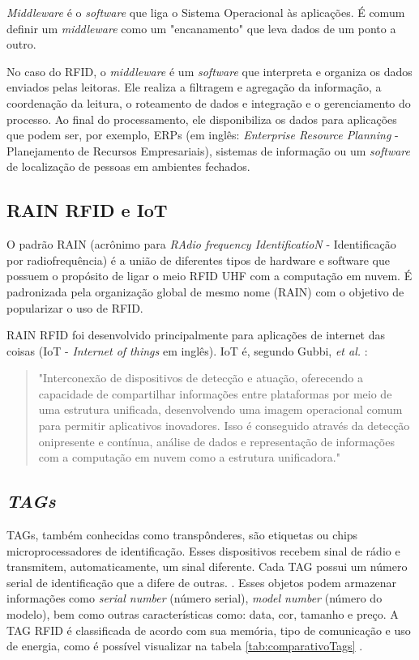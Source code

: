 \textit{Middleware} é o \textit{software} que liga o Sistema Operacional às aplicações. É comum definir um \textit{middleware} como um "encanamento" que leva dados de um ponto a outro. \cite{Middleware}

No caso do RFID, o \textit{middleware} é um \textit{software} que interpreta e organiza os dados enviados pelas leitoras. Ele realiza a filtragem e agregação da informação, a coordenação da leitura, o roteamento de dados e integração e o gerenciamento do processo. Ao final do processamento, ele disponibiliza os dados para aplicações que podem ser, por exemplo, ERPs (em inglês: \textit{Enterprise Resource Planning} - Planejamento de Recursos Empresariais), sistemas de informação ou um \textit{software} de localização de pessoas em ambientes fechados.

\subsection{RAIN RFID e IoT}

O padrão RAIN (acrônimo para \textit{RAdio frequency IdentificatioN} - Identificação por radiofrequência) é a união de diferentes tipos de hardware e software que possuem o propósito de ligar o meio RFID UHF com a computação em nuvem. É padronizada pela organização global de mesmo nome (RAIN) com o objetivo de popularizar o uso de RFID. \cite{RAIN}

RAIN RFID foi desenvolvido principalmente para aplicações de internet das coisas (IoT - \textit{Internet of things} em inglês). IoT é, segundo Gubbi, \textit{et al.} \cite{gubbi2013internet}:

\begin{quote}
    "Interconexão de dispositivos de detecção e atuação, oferecendo a capacidade de compartilhar informações entre plataformas por meio de uma estrutura unificada, desenvolvendo uma imagem operacional comum para permitir aplicativos inovadores. Isso é conseguido através da detecção onipresente e contínua, análise de dados e representação de informações com a computação em nuvem como a estrutura unificadora." \cite{gubbi2013internet}
\end{quote}

\subsection{\textit{TAGs}}
TAGs, também conhecidas como transpônderes, são etiquetas ou chips microprocessadores de identificação. Esses dispositivos recebem sinal de rádio e transmitem, automaticamente, um sinal diferente. Cada TAG possui um número serial de identificação que a difere de outras. \cite{chawla2007overview}. Esses objetos podem armazenar informações como \textit{serial number} (número serial), \textit{model number} (número do modelo), bem como outras características como: data, cor, tamanho e preço. A TAG RFID é classificada de acordo com sua memória, tipo de comunicação e uso de energia, como é possível visualizar na tabela \ref{tab:comparativoTags}  \cite{AhmedIntegrationStreamMapping}.

